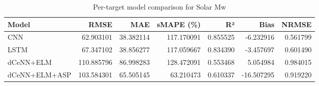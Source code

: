 \begin{table}
\caption{Per-target model comparison for Solar Mw}
\begin{tabular}{lrrrrrr}
\toprule
Model & RMSE & MAE & sMAPE (\%) & R² & Bias & NRMSE \\
\midrule
CNN & 62.903101 & 38.382114 & 117.170091 & 0.855525 & -6.232916 & 0.561799 \\
LSTM & 67.347102 & 38.856277 & 117.059667 & 0.834390 & -3.457697 & 0.601490 \\
dCeNN+ELM & 110.885796 & 86.998283 & 128.472091 & 0.553468 & 5.054984 & 0.984015 \\
dCeNN+ELM+ASP & 103.584301 & 65.505145 & 63.210473 & 0.610337 & -16.507295 & 0.919220 \\
\bottomrule
\end{tabular}
\end{table}
